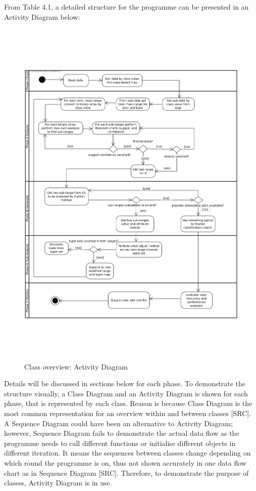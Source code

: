 From Table 4.1, a detailed structure for the programme can be presented in an Activity Diagram below:
\begin{figure}[h]
    \centering
    \includegraphics[width=6.5in, height=6.8in]{figures/activity_overview}
    \caption[Class overview: Activity Diagram]{Class overview: Activity Diagram}
    \label{fig:figure4_1}
\end{figure}


Details will be discussed in sections below for each phase. To demonstrate the structure visually, a Class Diagram and an Activity Diagram is shown for each phase, that is represented by each class. Reason is because Class Diagram is the most common representation for an overview within and between classes [SRC]. A Sequence Diagram could have been an alternative to Activity Diagram; however, Sequence Diagram fails to demonstrate the actual data flow as the programme needs to call different functions or initialise different objects in different iteration. It means the sequences between classes change depending on which round the programme is on, thus not shown accurately in one data flow chart as in Sequence Diagram [SRC]. Therefore, to demonstrate the purpose of classes, Activity Diagram is in use.

